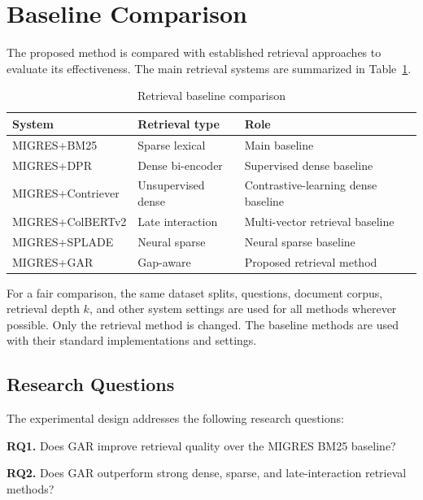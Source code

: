 \documentclass[12pt,a4paper]{report}
\begin{document}
\section{Baseline Comparison}

The proposed method is compared with established retrieval approaches to evaluate its effectiveness. The main retrieval systems are summarized in Table~\ref{tab:baseline-comparison}.

\begin{table}[H]
\centering
\caption{Retrieval baseline comparison}
\label{tab:baseline-comparison}
\renewcommand{\arraystretch}{1.25}
\begin{tabular}{|p{1.55in}|p{1.45in}|p{3.05in}|}
\hline
\textbf{System} & \textbf{Retrieval type} & \textbf{Role} \\ \hline
MIGRES+BM25 & Sparse lexical & Main baseline \cite{robertson2009bm25} \\ \hline
MIGRES+DPR & Dense bi-encoder & Supervised dense baseline \cite{karpukhin2020dpr} \\ \hline
MIGRES+Contriever & Unsupervised dense & Contrastive-learning dense baseline \cite{izacard2022contriever} \\ \hline
MIGRES+ColBERTv2 & Late interaction & Multi-vector retrieval baseline \cite{santhanam2022colbertv2} \\ \hline
MIGRES+SPLADE & Neural sparse & Neural sparse baseline \cite{formal2021splade} \\ \hline
MIGRES+GAR & Gap-aware & Proposed retrieval method \\ \hline
\end{tabular}
\end{table}

For a fair comparison, the same dataset splits, questions, document corpus, retrieval depth $k$, and other system settings are used for all methods wherever possible. Only the retrieval method is changed. The baseline methods are used with their standard implementations and settings.

\subsection{Research Questions}

The experimental design addresses the following research questions:

\textbf{RQ1.} Does GAR improve retrieval quality over the MIGRES BM25 baseline?

\textbf{RQ2.} Does GAR outperform strong dense, sparse, and late-interaction retrieval methods?
\end{document}
